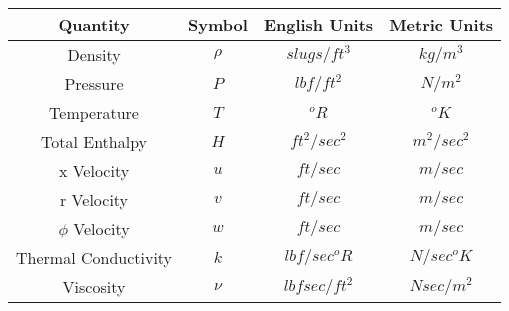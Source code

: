 \begin{center}
\begin{tabular}{ c c c c }
 Quantity & Symbol & English Units & Metric Units \\ 
\hline
 Density & $\rho$ & $slugs/ft^3$ & $kg/m^3$ \\  
 Pressure & $P$ & $lbf/ft^2$ & $N/m^2$ \\    
 Temperature & $T$ & $^oR$ & $^oK$ \\    
 Total Enthalpy & $H$ & $ft^2/sec^2$ & $m^2/sec^2$ \\    
 x Velocity & $u$ & $ft/sec$ & $m/sec$ \\    
 r Velocity & $v$ & $ft/sec$ & $m/sec$ \\    
 $\phi$ Velocity & $w$ & $ft/sec$ & $m/sec$ \\    
 Thermal Conductivity & $k$ & $lbf/sec ^oR$ & $N/sec ^oK$ \\    
 Viscosity & $\nu$ & $lbf sec/ft^2$ & $N sec/m^2$   
\end{tabular}
\end{center} 
